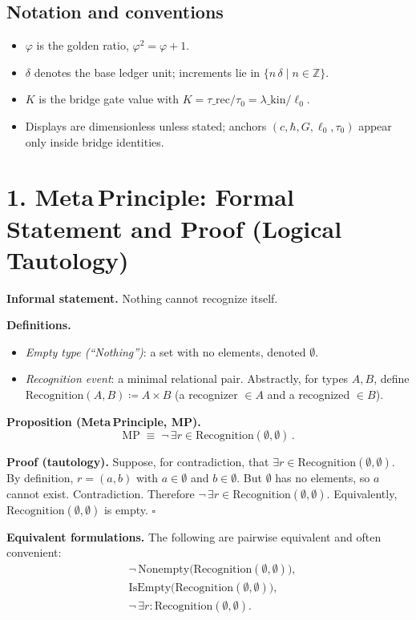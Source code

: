 \documentclass[11pt]{article}
\begin{document}
\subsection*{Notation and conventions}
\begin{itemize}[leftmargin=*]
  \item $\varphi$ is the golden ratio, $\varphi^2=\varphi+1$.
  \item $\delta$ denotes the base ledger unit; increments lie in $\{n\,\delta\mid n\in\mathbb Z\}$.
  \item $K$ is the bridge gate value with $K=\tau\_{\!\mathrm{rec}}/\tau_0=\lambda\_{\!\mathrm{kin}}/\ell_0$.
  \item Displays are dimensionless unless stated; anchors $(c,\hbar,G,\ell_0,\tau_0)$ appear only inside bridge identities.
\end{itemize}

\section*{1. Meta\,Principle: Formal Statement and Proof (Logical Tautology)}
\textbf{Informal statement.} Nothing cannot recognize itself.

\medskip
\textbf{Definitions.}
\begin{itemize}[leftmargin=*]
  \item \emph{Empty type (``Nothing'')}: a set with no elements, denoted $\emptyset$.
  \item \emph{Recognition event}: a minimal relational pair. Abstractly, for types $A,B$, define $\mathrm{Recognition}(A,B) \coloneqq A \times B$ (a recognizer $\in A$ and a recognized $\in B$).
\end{itemize}

\textbf{Proposition (Meta\,Principle, MP).}
\begin{equation*}
  \mathrm{MP} \;\equiv\; \neg\,\exists r\in \mathrm{Recognition}(\emptyset,\emptyset)\,.
\end{equation*}

\textbf{Proof (tautology).} Suppose, for contradiction, that $\exists r\in \mathrm{Recognition}(\emptyset,\emptyset)$. By definition, $r=(a,b)$ with $a\in\emptyset$ and $b\in\emptyset$. But $\emptyset$ has no elements, so $a$ cannot exist. Contradiction. Therefore $\neg\,\exists r\in \mathrm{Recognition}(\emptyset,\emptyset)$. Equivalently, $\mathrm{Recognition}(\emptyset,\emptyset)$ is empty. $\square$

\medskip
\textbf{Equivalent formulations.} The following are pairwise equivalent and often convenient:
\begin{align*}
  &\neg\,\mathrm{Nonempty}\big(\mathrm{Recognition}(\emptyset,\emptyset)\big),\\
  &\mathrm{IsEmpty}\big(\mathrm{Recognition}(\emptyset,\emptyset)\big),\\
  &\neg\,\exists r: \mathrm{Recognition}(\emptyset,\emptyset). 
\end{align*}
\end{document}
